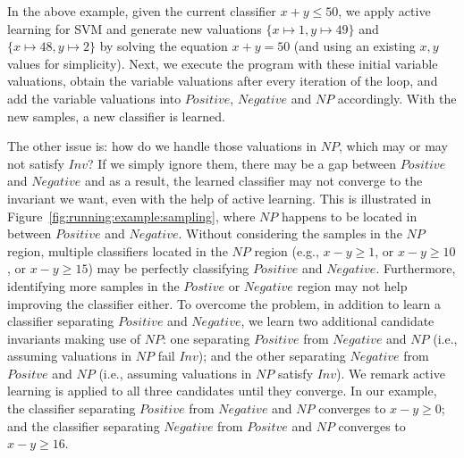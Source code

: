 \begin{example}
In the above example, given the current classifier $x+y \leq 50$, we apply active learning for SVM and generate new valuations $\{x \mapsto 1, y \mapsto 49\}$ and $\{x \mapsto 48, y \mapsto 2\}$ by solving the equation $x+y=50$ (and using an existing $x, y$ values for simplicity). Next, we execute the program with these initial variable valuations, obtain the variable valuations after every iteration of the loop, and add the variable valuations into $\mathit{Positive}$, $\mathit{Negative}$ and $\mathit{NP}$ accordingly. With the new samples, a new classifier is learned.
\end{example}
The other issue is: how do we handle those valuations in $\mathit{NP}$, which may or may not satisfy $Inv$? If we simply ignore them, there may be a gap between $\mathit{Positive}$ and $\mathit{Negative}$ and as a result, the learned classifier may not converge to the invariant we want, even with the help of active learning. This is illustrated in Figure~\ref{fig:running:example:sampling}, where $\mathit{NP}$ happens to be located in between $\mathit{Positive}$ and $\mathit{Negative}$. Without considering the samples in the $\mathit{NP}$ region, multiple classifiers located in the $\mathit{NP}$ region (e.g., $x - y \geq 1$, or $x - y \geq 10$, or $x - y \geq 15$) may be perfectly classifying $\mathit{Positive}$ and $\mathit{Negative}$. Furthermore, identifying more samples in the $Postive$ or $\mathit{Negative}$ region may not help improving the classifier either. To overcome the problem, in addition to learn a classifier separating $\mathit{Positive}$ and $\mathit{Negative}$, we learn two additional candidate invariants making use of $\mathit{NP}$: one separating $\mathit{Positive}$ from $\mathit{Negative}$ and $\mathit{NP}$ (i.e., assuming valuations in $\mathit{NP}$ fail $Inv$); and the other separating $\mathit{Negative}$ from $Positve$ and $\mathit{NP}$ (i.e., assuming valuations in $\mathit{NP}$ satisfy $Inv$). We remark active learning is applied to all three candidates until they converge. In our example, the classifier separating $\mathit{Positive}$ from $\mathit{Negative}$ and $\mathit{NP}$ converges to $x - y \geq 0$; and the classifier separating $\mathit{Negative}$ from $Positve$ and $\mathit{NP}$ converges to $x - y \geq 16$.

